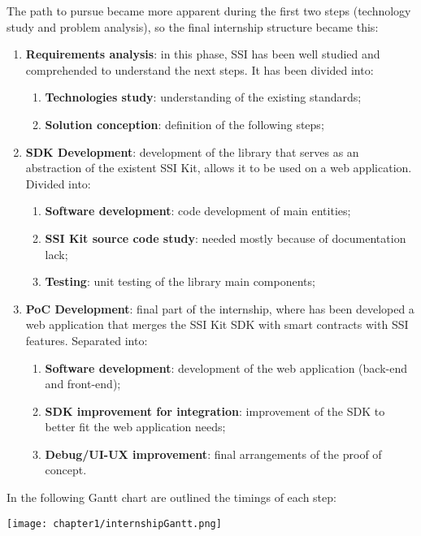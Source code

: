 \vspace*{0.3cm}
The path to pursue became more apparent during the first two steps (technology study 
and problem analysis), so the final internship structure became this:
\begin{enumerate}
    \item \textbf{Requirements analysis}: in this phase, SSI has been well studied 
    and comprehended to understand the next steps. It has been divided into:
    \vspace*{-0.1cm}
    \begin{enumerate}
        \setlength\itemsep{-0.1em}
        \item \textbf{Technologies study}: understanding of the existing standards;
        \item \textbf{Solution conception}: definition of the following steps;
    \end{enumerate}
    \vspace*{0.1cm}
    \item \textbf{SDK Development}: development of the library that serves as 
    an abstraction of the existent SSI Kit, allows it to be used on a web application.
    Divided into:
    \vspace*{-0.1cm}
    \begin{enumerate}
        \setlength\itemsep{-0.1em}
        \item \textbf{Software development}: code development of main entities;
        \item \textbf{SSI Kit source code study}: needed mostly because of 
        documentation lack;
        \item \textbf{Testing}: unit testing of the library main components;
    \end{enumerate}
    \vspace*{0.1cm}
    \item \textbf{PoC Development}: final part of the internship, where has been
    developed a web application that merges the SSI Kit SDK with smart contracts
    with SSI features. Separated into:
    \vspace*{-0.1cm}
    \begin{enumerate}
        \setlength\itemsep{-0.1em}
        \item \textbf{Software development}: development of the web application (back-end and
        front-end);
        \item \textbf{SDK improvement for integration}: improvement of the SDK to better 
        fit the web application needs;
        \item \textbf{Debug/UI-UX improvement}: final arrangements of the proof of concept.
    \end{enumerate}
\end{enumerate}
In the following Gantt chart are outlined the timings of each step:
\begin{center}
    \hspace*{-1cm}
    \texttt{[image: chapter1/internshipGantt.png]}
\end{center}
